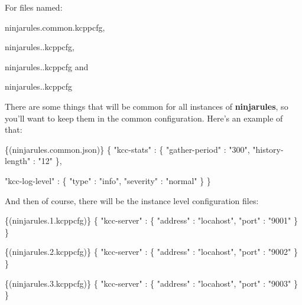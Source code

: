 For files named\-:
\begin{DoxyItemize}
\item ninjarules.\-common.\-kcppcfg,
\item ninjarules..\-kcppcfg,
\item ninjarules..\-kcppcfg and
\item ninjarules..\-kcppcfg
\end{DoxyItemize}

There are some things that will be common for all instances of {\bfseries ninjarules}, so you'll want to keep them in the common configuration. Here's an example of that\-: 
\begin{DoxyCode}
\{(ninjarules.common.json)\}
\{
  \textcolor{stringliteral}{"kcc-stats"}     : \{
    \textcolor{stringliteral}{"gather-period"}  : \textcolor{stringliteral}{"300"},
    \textcolor{stringliteral}{"history-length"} : \textcolor{stringliteral}{"12"}
  \},

  \textcolor{stringliteral}{"kcc-log-level"} : \{
    \textcolor{stringliteral}{"type"}           : \textcolor{stringliteral}{"info"},
    \textcolor{stringliteral}{"severity"}       : \textcolor{stringliteral}{"normal"}
  \}
\}
\end{DoxyCode}


And then of course, there will be the instance level configuration files\-: 
\begin{DoxyCode}
\{(ninjarules.1.kcppcfg)\}
\{
  \textcolor{stringliteral}{"kcc-server"}    : \{
    \textcolor{stringliteral}{"address"}        : \textcolor{stringliteral}{"locahost"},
    \textcolor{stringliteral}{"port"}           : \textcolor{stringliteral}{"9001"}
  \}
\}
\end{DoxyCode}
 
\begin{DoxyCode}
\{(ninjarules.2.kcppcfg)\}
\{
  \textcolor{stringliteral}{"kcc-server"}    : \{
    \textcolor{stringliteral}{"address"}        : \textcolor{stringliteral}{"locahost"},
    \textcolor{stringliteral}{"port"}           : \textcolor{stringliteral}{"9002"}
  \}
\}
\end{DoxyCode}
 
\begin{DoxyCode}
\{(ninjarules.3.kcppcfg)\}
\{
  \textcolor{stringliteral}{"kcc-server"}    : \{
    \textcolor{stringliteral}{"address"}        : \textcolor{stringliteral}{"locahost"},
    \textcolor{stringliteral}{"port"}           : \textcolor{stringliteral}{"9003"}
  \}
\}
\end{DoxyCode}
 